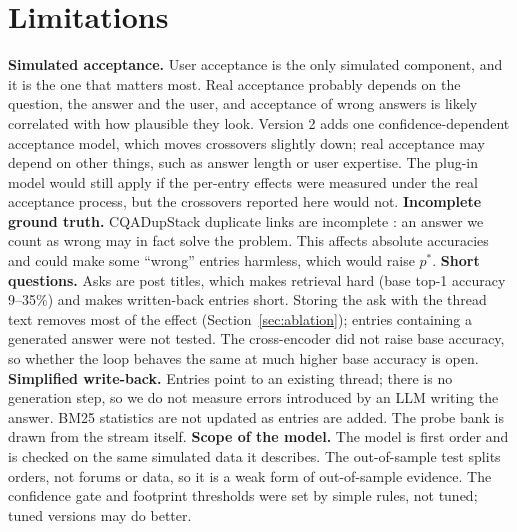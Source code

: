 \documentclass[11pt]{article}
\begin{document}
\section{Limitations}
\textbf{Simulated acceptance.} User acceptance is the only simulated component, and it is the one that matters most. Real acceptance probably depends on the question, the answer and the user, and acceptance of wrong answers is likely correlated with how plausible they look. Version 2 adds one confidence-dependent acceptance model, which moves crossovers slightly down; real acceptance may depend on other things, such as answer length or user expertise. The plug-in model would still apply if the per-entry effects were measured under the real acceptance process, but the crossovers reported here would not.
\textbf{Incomplete ground truth.} CQADupStack duplicate links are incomplete \citep{hoogeveen2015cqadupstack}: an answer we count as wrong may in fact solve the problem. This affects absolute accuracies and could make some ``wrong'' entries harmless, which would raise $p^*$.
\textbf{Short questions.} Asks are post titles, which makes retrieval hard (base top-1 accuracy 9--35\%) and makes written-back entries short. Storing the ask with the thread text removes most of the effect (Section~\ref{sec:ablation}); entries containing a generated answer were not tested. The cross-encoder did not raise base accuracy, so whether the loop behaves the same at much higher base accuracy is open.
\textbf{Simplified write-back.} Entries point to an existing thread; there is no generation step, so we do not measure errors introduced by an LLM writing the answer. BM25 statistics are not updated as entries are added. The probe bank is drawn from the stream itself.
\textbf{Scope of the model.} The model is first order and is checked on the same simulated data it describes. The out-of-sample test splits orders, not forums or data, so it is a weak form of out-of-sample evidence. The confidence gate and footprint thresholds were set by simple rules, not tuned; tuned versions may do better.
\end{document}
